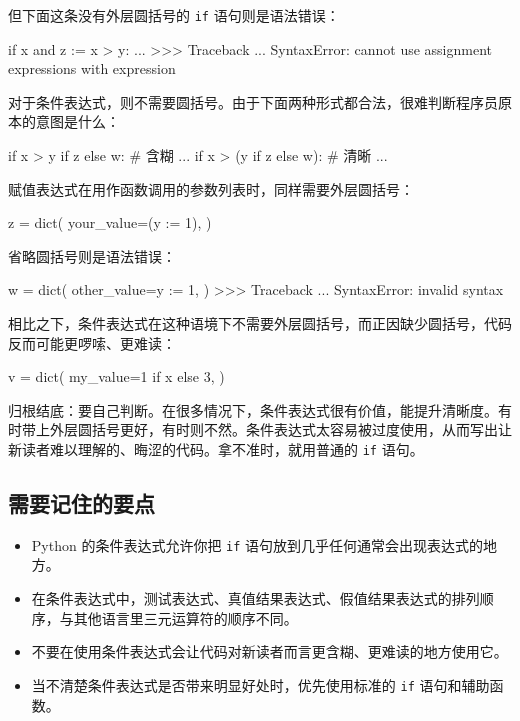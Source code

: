 但下面这条没有外层圆括号的 \texttt{if} 语句则是语法错误：

\begin{codebox}[python]
if x and z := x > y:
    ...
>>>
Traceback ...
SyntaxError: cannot use assignment expressions with expression
\end{codebox}

对于条件表达式，则不需要圆括号。由于下面两种形式都合法，很难判断程序员原本的意图是什么：

\begin{codebox}[python]
if x > y if z else w:    # 含糊
    ...
if x > (y if z else w):  # 清晰
    ...
\end{codebox}

赋值表达式在用作函数调用的参数列表时，同样需要外层圆括号：

\begin{codebox}[python]
z = dict(
    your_value=(y := 1),
)
\end{codebox}

省略圆括号则是语法错误：

\begin{codebox}[python]
w = dict(
    other_value=y := 1,
)
>>>
Traceback ...
SyntaxError: invalid syntax
\end{codebox}

相比之下，条件表达式在这种语境下不需要外层圆括号，而正因缺少圆括号，代码反而可能更啰嗦、更难读：

\begin{codebox}[python]
v = dict(
    my_value=1 if x else 3,
)
\end{codebox}

归根结底：要自己判断。在很多情况下，条件表达式很有价值，能提升清晰度。有时带上外层圆括号更好，有时则不然。条件表达式太容易被过度使用，从而写出让新读者难以理解的、晦涩的代码。拿不准时，就用普通的 \texttt{if} 语句。

\subsection{需要记住的要点}

\begin{itemize}
\item Python 的条件表达式允许你把 \texttt{if} 语句放到几乎任何通常会出现表达式的地方。
\item 在条件表达式中，测试表达式、真值结果表达式、假值结果表达式的排列顺序，与其他语言里三元运算符的顺序不同。
\item 不要在使用条件表达式会让代码对新读者而言更含糊、更难读的地方使用它。
\item 当不清楚条件表达式是否带来明显好处时，优先使用标准的 \texttt{if} 语句和辅助函数。
\end{itemize}

